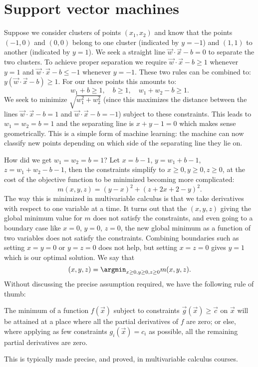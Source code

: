 \section{Support vector machines}
Suppose we consider clusters of points $(x_1,x_2)$ and know that the points $(-1,0)$ and $(0,0)$ belong to one cluster (indicated by $y=-1$) and $(1,1)$ to another (indicated by $y=1$).
We seek a straight line $\vec w\cdot\vec x-b=0$ to separate the two clusters.
To achieve proper separation we require $\vec w\cdot\vec x-b\ge 1$ whenever $y=1$ and
$\vec w\cdot\vec x-b\le -1$ whenever $y=-1$.
These two rules can be combined to: $y(\vec w\cdot\vec x-b)\ge 1$.
For our three points this amounts to:
\[
w_1+b\ge 1,\quad b\ge 1,\quad w_1+w_2-b\ge 1.
\]
We seek to minimize $\sqrt{w_1^2+w_2^2}$ (since this maximizes the distance between the lines $\vec w\cdot\vec x-b= 1$ and $\vec w\cdot\vec x-b= -1$) subject to these constraints. This leads to $w_1=w_2=b=1$ and the separating line is $x+y-1=0$ which makes sense geometrically. This is a simple form of machine learning: the machine can now classify new points depending on which side of the separating line they lie on.


How did we get $w_1=w_2=b=1$? Let $x=b-1$, $y=w_1+b-1$, $z=w_1+w_2-b-1$, then the constraints simplify to $x\ge 0, y\ge 0, z\ge 0$, at the cost of the objective function to be minimized becoming more complicated:
\[
	m(x,y,z)=(y-x)^2+(z+2x+2-y)^2.
\]
The way this is minimized in multivariable calculus is that we take derivatives with respect to one variable at a time. It turns out that the $(x,y,z)$ giving the global minimum value for $m$  does not satisfy the constraints, and even going to a boundary case like $x=0$, $y=0$, $z=0$, the new global minimum as a function of two variables does not satisfy the constraints. Combining boundaries such as setting $x=y=0$ or $y=z=0$ does not help, but setting $x=z=0$ gives $y=1$ which is our optimal solution.
We say that
\[
	(x,y,z) = \argmin_{x\ge 0, y\ge 0, z\ge 0} m(x,y,z).
\]
Without discussing the precise assumption required, we have the following rule of thumb:
\begin{thm}
The minimum of a function $f(\vec x)$ subject to constraints $\vec g(\vec x)\ge\vec c$ on $\vec x$ will be attained at a place where all the partial derivatives of $f$ are zero; or else, where applying as few constraints $g_i(\vec x)=c_i$ as possible, all the remaining partial derivatives are zero.
\end{thm}
This is typically made precise, and proved, in multivariable calculus courses.

